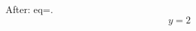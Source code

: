 \documentclass{article}
\begin{document}
\begin{table}
\end{table}
After: eq=\the\value{equation}.
\begin{equation}y=2\end{equation}
\end{document}
